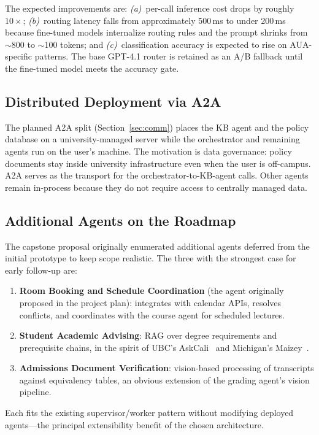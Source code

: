 \documentclass[conference]{IEEEtran}
\begin{document}
The expected improvements are: \emph{(a)}~per-call inference cost drops by roughly $10\times$; \emph{(b)}~routing latency falls from approximately 500\,ms to under 200\,ms because fine-tuned models internalize routing rules and the prompt shrinks from $\sim$800 to $\sim$100 tokens; and \emph{(c)}~classification accuracy is expected to rise on AUA-specific patterns. The base GPT-4.1 router is retained as an A/B fallback until the fine-tuned model meets the accuracy gate.

\subsection{Distributed Deployment via A2A}

The planned A2A split (Section~\ref{sec:comm}) places the KB agent and the policy database on a university-managed server while the orchestrator and remaining agents run on the user's machine. The motivation is data governance: policy documents stay inside university infrastructure even when the user is off-campus. A2A serves as the transport for the orchestrator-to-KB-agent calls. Other agents remain in-process because they do not require access to centrally managed data.

\subsection{Additional Agents on the Roadmap}

The capstone proposal originally enumerated additional agents deferred from the initial prototype to keep scope realistic. The three with the strongest case for early follow-up are:
\begin{enumerate}
    \item \textbf{Room Booking and Schedule Coordination} (the agent originally proposed in the project plan): integrates with calendar APIs, resolves conflicts, and coordinates with the course agent for scheduled lectures.
    \item \textbf{Student Academic Advising}: RAG over degree requirements and prerequisite chains, in the spirit of UBC's AskCali~\cite{ubc_askcali_2025} and Michigan's Maizey~\cite{umich_maizey_2025}.
    \item \textbf{Admissions Document Verification}: vision-based processing of transcripts against equivalency tables, an obvious extension of the grading agent's vision pipeline.
\end{enumerate}
Each fits the existing supervisor/worker pattern without modifying deployed agents---the principal extensibility benefit of the chosen architecture.
\end{document}
